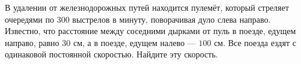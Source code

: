 В удалении от железнодорожных путей находится пулемёт, который стреляет очередями по $300$ выстрелов в минуту, поворачивая дуло слева направо. Известно, что расстояние между соседними дырками от пуль в поезде, едущем направо, равно $30$ см, а в поезде, едущем налево --- $100$ см. Все поезда ездят с одинаковой постоянной скоростью. Найдите эту скорость.